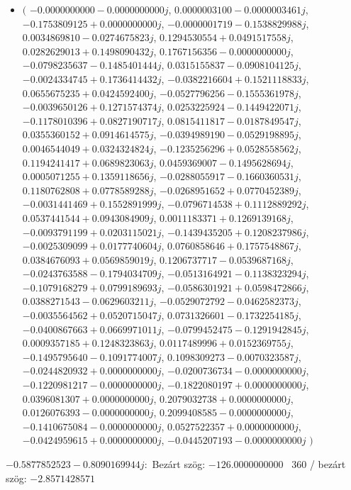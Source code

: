 \documentclass[14pt,a4paper]{article}
\begin{document}
\begin{itemize}
\item
$\big($
$-0.0000000000-0.0000000000j$, $0.0000003100-0.0000003461j$, $-0.1753809125+0.0000000000j$, $-0.0000001719-0.1538829988j$, $0.0034869810-0.0274675823j$, $0.1294530554+0.0491517558j$, $0.0282629013+0.1498090432j$, $0.1767156356-0.0000000000j$, $-0.0798235637-0.1485401444j$, $0.0315155837-0.0908104125j$, $-0.0024334745+0.1736414432j$, $-0.0382216604+0.1521118833j$, $0.0655675235+0.0424592400j$, $-0.0527796256-0.1555361978j$, $-0.0039650126+0.1271574374j$, $0.0253225924-0.1449422071j$, $-0.1178010396+0.0827190717j$, $0.0815411817-0.0187849547j$, $0.0355360152+0.0914614575j$, $-0.0394989190-0.0529198895j$, $0.0046544049+0.0324324824j$, $-0.1235256296+0.0528558562j$, $0.1194241417+0.0689823063j$, $0.0459369007-0.1495628694j$, $0.0005071255+0.1359118656j$, $-0.0288055917-0.1660360531j$, $0.1180762808+0.0778589288j$, $-0.0268951652+0.0770452389j$, $-0.0031441469+0.1552891999j$, $-0.0796714538+0.1112889292j$, $0.0537441544+0.0943084909j$, $0.0011183371+0.1269139168j$, $-0.0093791199+0.0203115021j$, $-0.1439435205+0.1208237986j$, $-0.0025309099+0.0177740604j$, $0.0760858646+0.1757548867j$, $0.0384676093+0.0569859019j$, $0.1206737717-0.0539687168j$, $-0.0243763588-0.1794034709j$, $-0.0513164921-0.1138323294j$, $-0.1079168279+0.0799189693j$, $-0.0586301921+0.0598472866j$, $0.0388271543-0.0629603211j$, $-0.0529072792-0.0462582373j$, $-0.0035564562+0.0520715047j$, $0.0731326601-0.1732254185j$, $-0.0400867663+0.0669971011j$, $-0.0799452475-0.1291942845j$, $0.0009357185+0.1248323863j$, $0.0117489996+0.0152369755j$, $-0.1495795640-0.1091774007j$, $0.1098309273-0.0070323587j$, $-0.0244820932+0.0000000000j$, $-0.0200736734-0.0000000000j$, $-0.1220981217-0.0000000000j$, $-0.1822080197+0.0000000000j$, $0.0396081307+0.0000000000j$, $0.2079032738+0.0000000000j$, $0.0126076393-0.0000000000j$, $0.2099408585-0.0000000000j$, $-0.1410675084-0.0000000000j$, $0.0527522357+0.0000000000j$, $-0.0424959615+0.0000000000j$, $-0.0445207193-0.0000000000j$
$\big)$
\end{itemize}
$-0.5877852523-0.8090169944j$:\
Bezárt szög: $-126.0000000000$ \
360 / bezárt szög: $-2.8571428571$\
\end{document}
